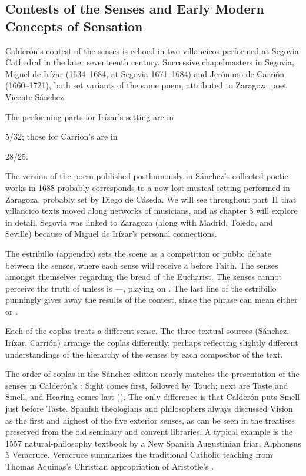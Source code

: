 \subsection{Contests of the Senses and Early Modern Concepts of Sensation}

Calderón's contest of the senses is echoed in two villancicos performed at Segovia Cathedral in the later seventeenth century.
Successive chapelmasters in Segovia, Miguel de Irízar (1634--1684, at Segovia 1671--1684) and Jerónimo de Carrión (1660--1721), both set variants of the same poem, attributed to Zaragoza poet Vicente Sánchez.%
  \begin{Footnote}
  The performing parts for Irízar's setting are in \signature{E-SE}{5/32}; those for Carrión's are in \signature{E-SE}{28/25}.
  \end{Footnote}
The version of the poem published posthumously in Sánchez's collected poetic works in 1688 probably corresponds to a now-lost musical setting performed in Zaragoza, probably set by Diego de Cáseda.%
  \autocite[171--172]{Sanchez:LiraPoetica}
We will see throughout part~II that villancico texts moved along networks of musicians, and as chapter 8 will explore in detail, Segovia was linked to Zaragoza (along with Madrid, Toledo, and Seville) because of Miguel de Irízar's personal connections.

The estribillo (appendix\XXX) sets the scene as a competition or public debate between the senses, where each sense will receive a  before Faith.
The senses  amongst themselves regarding the bread of the Eucharist.
The senses cannot perceive the truth of  unless  is ---, playing on .
The last line of the estribillo punningly gives away the results of the contest, since the phrase  can mean either  or .


Each of the coplas treats a different sense.
The three textual sources (Sánchez, Irízar, Carrión) arrange the coplas differently, perhaps reflecting slightly different understandings of the hierarchy of the senses by each compositor of the text.

The order of coplas in the Sánchez edition nearly matches the presentation of the senses in Calderón's : Sight comes first, followed by Touch; next are Taste and Smell, and Hearing comes last ().
The only difference is that Calderón puts Smell just before Taste.
Spanish theologians and philosophers always discussed Vision as the first and highest of the five exterior senses, as can be seen in the treatises preserved from the old seminary and convent libraries.
A typical example is the 1557 natural-philosophy textbook  by a New Spanish Augustinian friar, Alphonsus à Veracruce.%
  \autocite{Veracruce:Phisica}
Veracruce summarizes the traditional Catholic teaching from Thomas Aquinas's Christian appropriation of Aristotle's .

